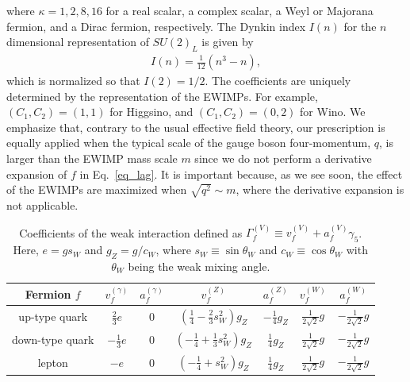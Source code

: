 \documentclass[12pt,twoside,book]{article}
\begin{document}
where $\kappa = 1, 2, 8, 16$ for a real scalar, a complex scalar, a
Weyl or Majorana fermion, and a Dirac fermion, respectively.  The Dynkin index $I(n)$ for the $n$ dimensional representation of
$SU(2)_L$ is given by
\begin{align}
  I(n) = \frac{1}{12} (n^3 - n),\label{eq_dynkin}
\end{align}
which is normalized so that $I(2) = 1/2$.  The coefficients are
uniquely determined by the representation of the EWIMPs. For example,
$(C_1, C_2) = (1, 1)$ for Higgsino, and $(C_1, C_2) = (0, 2)$ for
Wino.  We emphasize that, contrary to the usual effective field
theory, our prescription is equally applied when the typical scale of
the gauge boson four-momentum, $q$, is larger than the EWIMP mass
scale $m$ since we do not perform a derivative expansion of $f$ in
Eq.~\eqref{eq_lag}.  It is important because, as we see soon, the
effect of the EWIMPs are maximized when $\sqrt{q^2}\sim m$, where the
derivative expansion is not applicable.

\begin{table}[t]
  \centering
  \def\arraystretch{1.2}
  \begin{tabular}{c|cccccc}
    Fermion $f$ & $v_f^{(\gamma)}$ & $a_f^{(\gamma)}$ & $v_f^{(Z)}$ & $a_f^{(Z)}$ & $v_f^{(W)}$ & $a_f^{(W)}$ \\ \hline
    up-type quark & $\frac{2}{3}e$ & 0 & $(\frac{1}{4}-\frac{2}{3}s_W^2) g_Z$ & $-\frac{1}{4}g_Z$ & $\frac{1}{2\sqrt{2}}g$ & $-\frac{1}{2\sqrt{2}}g$ \\
    down-type quark & $-\frac{1}{3}e$ & 0 & $(-\frac{1}{4}+\frac{1}{3}s_W^2)g_Z$ & $\frac{1}{4}g_Z$ & $\frac{1}{2\sqrt{2}}g$ & $-\frac{1}{2\sqrt{2}}g$ \\
    lepton & $-e$ & 0 & $(-\frac{1}{4}+s_W^2)g_Z$ & $\frac{1}{4}g_Z$ & $\frac{1}{2\sqrt{2}}g$ & $-\frac{1}{2\sqrt{2}}g$ \\
  \end{tabular}
  \caption{Coefficients of the weak interaction defined as
    $\Gamma_f^{(V)} \equiv v_f^{(V)} + a_f^{(V)} \gamma_5$.  Here, $e = g
    s_W$ and $g_Z = g / c_W$, where $s_W \equiv \sin \theta_W$ and $c_W
    \equiv \cos \theta_W$ with $\theta_W$ being the weak mixing angle.}
  \label{table_weak}
\end{table}
\end{document}
